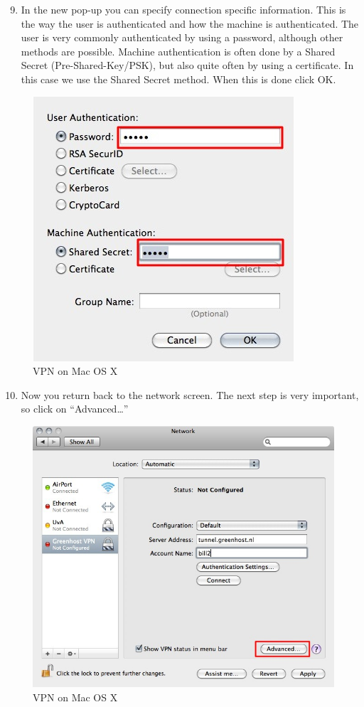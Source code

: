 \begin{enumerate}[1.]
\setcounter{enumi}{8}
\item
  In the new pop-up you can specify connection specific information.
  This is the way the user is authenticated and how the machine is
  authenticated. The user is very commonly authenticated by using a
  password, although other methods are possible. Machine authentication
  is often done by a Shared Secret (Pre-Shared-Key/PSK), but also quite
  often by using a certificate. In this case we use the Shared Secret
  method. When this is done click OK.
\end{enumerate}
\begin{figure}[htbp]
\centering
\includegraphics{vpn_osx_09.jpg}
\caption{VPN on Mac OS X}
\end{figure}

\begin{enumerate}[1.]
\setcounter{enumi}{9}
\item
  Now you return back to the network screen. The next step is very
  important, so click on ``Advanced\ldots{}''
\end{enumerate}
\begin{figure}[htbp]
\centering
\includegraphics{vpn_osx_09b.jpg}
\caption{VPN on Mac OS X}
\end{figure}

